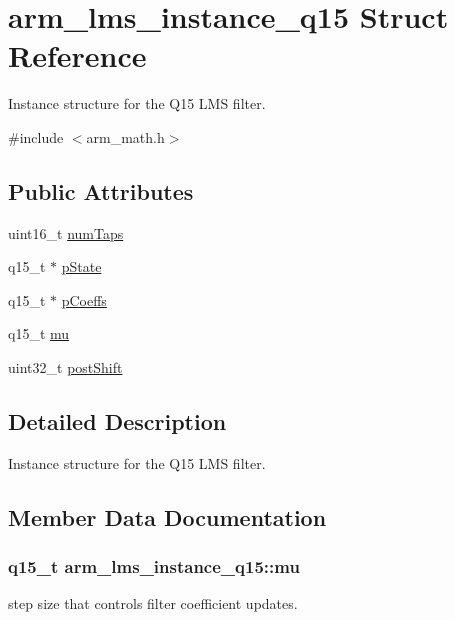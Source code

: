 \hypertarget{structarm__lms__instance__q15}{}\section{arm\+\_\+lms\+\_\+instance\+\_\+q15 Struct Reference}
\label{structarm__lms__instance__q15}


Instance structure for the Q15 L\+MS filter.  




{\ttfamily \#include $<$arm\+\_\+math.\+h$>$}

\subsection*{Public Attributes}
\begin{DoxyCompactItemize}
\item 
uint16\+\_\+t \hyperlink{structarm__lms__instance__q15_a0078e894f805af1b360369e619fb57b3}{num\+Taps}
\item 
q15\+\_\+t $\ast$ \hyperlink{structarm__lms__instance__q15_a9a575ff82c1e68cbb583083439260d08}{p\+State}
\item 
q15\+\_\+t $\ast$ \hyperlink{structarm__lms__instance__q15_a42f95368b94898eb82608e1113d18cab}{p\+Coeffs}
\item 
q15\+\_\+t \hyperlink{structarm__lms__instance__q15_aae46129d7cfd7f1c162cc502ed0a9d49}{mu}
\item 
uint32\+\_\+t \hyperlink{structarm__lms__instance__q15_acca5fbaef4a52ae411de24c9a0b929cf}{post\+Shift}
\end{DoxyCompactItemize}


\subsection{Detailed Description}
Instance structure for the Q15 L\+MS filter. 

\subsection{Member Data Documentation}
\subsubsection[{\texorpdfstring{mu}{mu}}]{\setlength{\rightskip}{0pt plus 5cm}q15\+\_\+t arm\+\_\+lms\+\_\+instance\+\_\+q15\+::mu}\hypertarget{structarm__lms__instance__q15_aae46129d7cfd7f1c162cc502ed0a9d49}{}\label{structarm__lms__instance__q15_aae46129d7cfd7f1c162cc502ed0a9d49}
step size that controls filter coefficient updates. 
